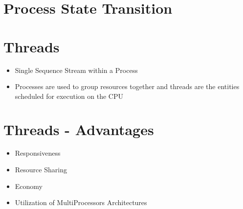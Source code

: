 \documentclass[12pt]{article}
\newcommand*{\thread}{
\begin{circuitikz}[
 longpot/.style = {R, resistors/scale=0.75,
 resistors/width=1.6, resistors/zigs=6}]
 \draw (0,0) to[longpot] ++(0,-3);
\end{circuitikz}
}
\begin{document}
\section{Process State Transition}





\section{Threads}


\begin{itemize}
	\item Single Sequence Stream within a Process
	\item Processes are used to group resources together and threads are the entities scheduled for execution on the CPU
\end{itemize}




\section{Threads - Advantages}


\begin{itemize}
	\item Responsiveness
	\item Resource Sharing
	\item Economy
	\item Utilization of MultiProcessors Architectures
\end{itemize}





\begin{center}
\end{center}
\end{document}
